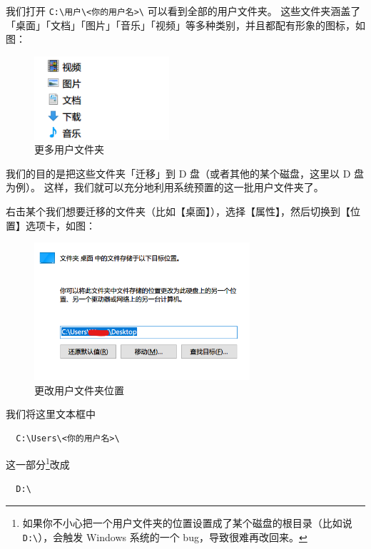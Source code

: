 我们打开 \verb|C:\用户\<你的用户名>\| 可以看到全部的用户文件夹。
这些文件夹涵盖了「桌面」「文档」「图片」「音乐」「视频」等多种类别，并且都配有形象的图标，如图：

\begin{figure}[htb!]
  \centering
  \includegraphics[width=5cm]{assets/All_User_Directories.png}
  \caption{更多用户文件夹}
  \label{All_User_Directories}
\end{figure}

我们的目的是把这些文件夹「迁移」到 D 盘（或者其他的某个磁盘，这里以 D 盘为例）。
这样，我们就可以充分地利用系统预置的这一批用户文件夹了。

右击某个我们想要迁移的文件夹（比如【桌面】），选择【属性】，然后切换到【位置】选项卡，如图：

\begin{figure}[htb!]
  \centering
  \includegraphics[width=8cm]{assets/Change_Directories.png}
  \caption{更改用户文件夹位置}
  \label{Change_Directories}
\end{figure}

我们将这里文本框中

\begin{verbatim}
  C:\Users\<你的用户名>\
\end{verbatim}

这一部分\footnote{如果你不小心把一个用户文件夹的位置设置成了某个磁盘的根目录（比如说\texttt{D:\textbackslash}），会触发 Windows 系统的一个 bug，导致很难再改回来。}改成

\begin{verbatim}
  D:\
\end{verbatim}


